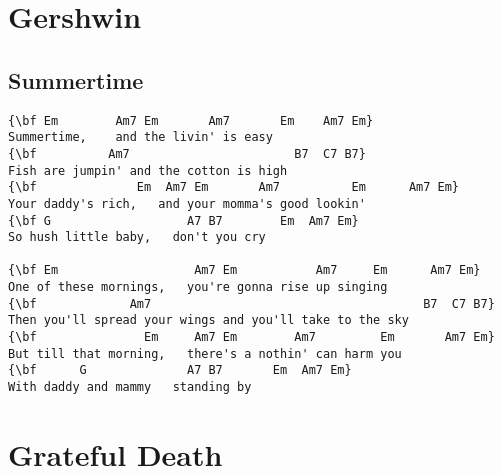 \documentclass[a4paper]{article}
\begin{document}
\section{Gershwin}
\subsection{Summertime}
\begin{Verbatim}[commandchars=\\\{\}]
{\bf Em        Am7 Em       Am7       Em    Am7 Em}
Summertime,    and the livin' is easy
{\bf          Am7                       B7  C7 B7}
Fish are jumpin' and the cotton is high
{\bf              Em  Am7 Em       Am7          Em      Am7 Em}
Your daddy's rich,   and your momma's good lookin'
{\bf G                   A7 B7        Em  Am7 Em}
So hush little baby,   don't you cry

{\bf Em                   Am7 Em           Am7     Em      Am7 Em}
One of these mornings,   you're gonna rise up singing
{\bf             Am7                                      B7  C7 B7}
Then you'll spread your wings and you'll take to the sky
{\bf               Em     Am7 Em        Am7         Em       Am7 Em}
But till that morning,   there's a nothin' can harm you
{\bf      G              A7 B7       Em  Am7 Em}
With daddy and mammy   standing by

\end{Verbatim}
\newpage
\section{Grateful Death}
\end{document}
